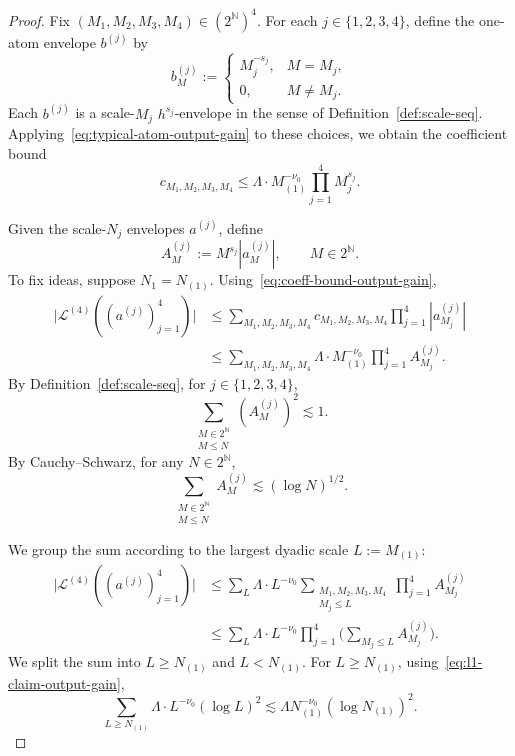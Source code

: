 \documentclass[11pt,reqno,english]{amsart}
\numberwithin{equation}{section}
\theoremstyle{plain}
\theoremstyle{definition}
\theoremstyle{remark}
\newcommand{\N}{\mathbb{N}}
\begin{document}
\begin{proof}
	Fix $(M_1,M_2,M_3,M_4)\in(2^{\N})^4$. For each $j\in\{1,2,3,4\}$, define the one-atom
	envelope $b^{(j)}$ by
	\[
	b_M^{(j)}:=
	\begin{cases}
		M_j^{-s_j},& M=M_j,\\
		0,& M\neq M_j.
	\end{cases}
	\]
	Each $b^{(j)}$ is a scale-$M_j$ $h^{s_j}$-envelope in the sense of
	Definition~\ref{def:scale-seq}. Applying~\eqref{eq:typical-atom-output-gain} to these choices, we obtain the coefficient bound
	\begin{equation}\label{eq:coeff-bound-output-gain}
		c_{M_1,M_2,M_3,M_4}
		\leq
		\Lambda \cdot M_{(1)}^{-\nu_0}
		\prod_{j=1}^4 M_j^{s_j}.
	\end{equation}

	Given the scale-$N_j$ envelopes $a^{(j)}$, define
	\[
	A_M^{(j)}:=M^{s_j}|a_M^{(j)}|,\qquad M\in 2^{\N}.
	\]
	To fix ideas, suppose $N_1=N_{(1)}$.
	Using~\eqref{eq:coeff-bound-output-gain},
	\begin{align*}
		\big|\mathcal{L}^{(4)}((a^{(j)})_{j=1}^4)\big|
		&\leq
		\sum_{M_1,M_2,M_3,M_4}
		c_{M_1,M_2,M_3,M_4}\prod_{j=1}^4 |a^{(j)}_{M_j}|\\
		&\leq
		\sum_{M_1,M_2,M_3,M_4}
		\Lambda\cdot M_{(1)}^{-\nu_0}
		\prod_{j=1}^4 A^{(j)}_{M_j}.
	\end{align*}
	By Definition~\ref{def:scale-seq}, for $j\in\{1,2,3,4\}$,
	\begin{equation}\label{eq:l2-claim-output-gain}
		\sum_{\substack{M\in 2^{\N}\\ M\leq N}} (A_M^{(j)})^2\lesssim 1.
	\end{equation}
	By Cauchy--Schwarz, for any $N\in 2^{\N}$,
	\begin{equation}\label{eq:l1-claim-output-gain}
		\sum_{\substack{M\in 2^{\N}\\ M\leq N}} A_M^{(j)}\lesssim (\log N)^{1/2}.
	\end{equation}

	We group the sum according to the largest dyadic scale $L:=M_{(1)}$:
	\begin{align*}
		\big|\mathcal{L}^{(4)}((a^{(j)})_{j=1}^4)\big|
		&\leq
		\sum_{L}
		\Lambda\cdot L^{-\nu_0}
		\sum_{\substack{M_1,M_2,M_3,M_4\\ M_j\leq L}}
		\prod_{j=1}^4 A_{M_j}^{(j)}\\
		&\leq
		\sum_{L}
		\Lambda\cdot L^{-\nu_0}
		\prod_{j=1}^4\Big(\sum_{M_j\leq L} A_{M_j}^{(j)}\Big).
	\end{align*}
	We split the sum into $L\geq N_{(1)}$ and $L<N_{(1)}$. For $L\geq N_{(1)}$, using~\eqref{eq:l1-claim-output-gain},
	\[
	\sum_{L\geq N_{(1)}}
	\Lambda\cdot L^{-\nu_0}(\log L)^2\lesssim \Lambda N_{(1)}^{-\nu_0}(\log N_{(1)})^{2}.
	\]


\end{proof}
\end{document}
